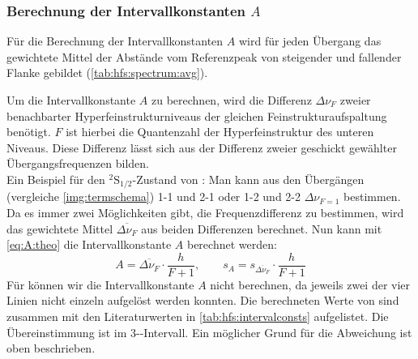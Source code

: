 \subsubsection*{Berechnung der Intervallkonstanten $A$}
Für die Berechnung der Intervallkonstanten $A$ wird für jeden Übergang das gewichtete Mittel der Abstände vom Referenzpeak 
von steigender und fallender Flanke gebildet (\autoref{tab:hfs:spectrum:avg}).

Um die Intervallkonstante $A$ zu berechnen, wird die Differenz $\Delta \nu_F$ zweier benachbarter Hyperfeinstrukturniveaus der 
gleichen Feinstrukturaufspaltung benötigt. $F$ ist hierbei die Quantenzahl der Hyperfeinstruktur des unteren Niveaus. 
Diese Differenz lässt sich aus der Differenz zweier geschickt gewählter Übergangsfrequenzen bilden. \\
Ein Beispiel für den ${}^2\text{S}_{1/2}$-Zustand von : Man kann aus den Übergängen (vergleiche \autoref{img:termschema}) 
1-1 und 2-1 oder 1-2 und 2-2 $\Delta \nu_{F=1}$ bestimmen. \\
Da es immer zwei Möglichkeiten gibt, die Frequenzdifferenz zu bestimmen, wird das gewichtete Mittel $\overline{\Delta \nu_F}$ aus beiden Differenzen berechnet. Nun kann mit 
\autoref{eq:A:theo} die Intervallkonstante $A$ berechnet werden:
\begin{equation}
    A = \overline{\Delta \nu_F} \cdot \frac{h}{F + 1}, \qquad s_A = s_{\overline{\Delta \nu_F}} \cdot \frac{h}{F + 1}
\end{equation}
Für  können wir die Intervallkonstante $A$ nicht berechnen, da jeweils zwei der vier Linien nicht einzeln aufgelöst werden konnten. Die 
berechneten Werte von  sind zusammen mit den Literaturwerten \cite{manual} in \autoref{tab:hfs:intervalconsts} aufgelistet. 
Die Übereinstimmung ist im 3-\textsigma-Intervall. Ein möglicher Grund für die Abweichung ist oben beschrieben.
